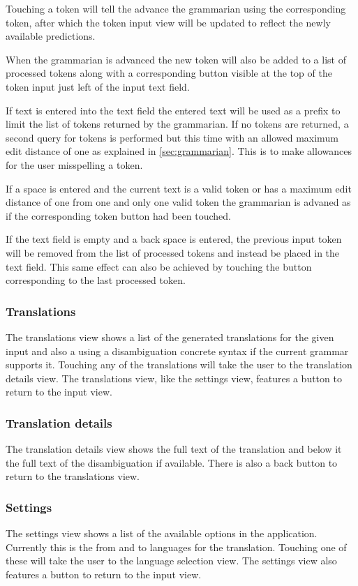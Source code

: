 Touching a token will tell the advance the grammarian using the corresponding token, after which the token input view will be updated to reflect the newly available predictions.

When the grammarian is advanced the new token will also be added to a list of processed tokens along with a corresponding button visible at the top of the token input just left of the input text field.

If text is entered into the text field the entered text will be used as a prefix to limit the list of tokens returned by the grammarian. If no tokens are returned, a second query for tokens is performed but this time with an allowed maximum edit distance of one as explained in \ref{sec:grammarian}. This is to make allowances for the user misspelling a token.

If a space is entered and the current text is a valid token or has a maximum edit distance of one from one and only one valid token the grammarian is advaned as if the corresponding token button had been touched.

If the text field is empty and a back space is entered, the previous input token will be removed from the list of processed tokens and instead be placed in the text field. This same effect can also be achieved by touching the button corresponding to the last processed token.


\subsubsection{Translations}
The translations view shows a list of the generated translations for the given input and also a using a disambiguation concrete syntax if the current grammar supports it. Touching any of the translations will take the user to the translation details view. The translations view, like the settings view, features a button to return to the input view.


\subsubsection{Translation details}
The translation details view shows the full text of the translation and below it the full text of the disambiguation if available. There is also a back button to return to the translations view.


\subsubsection{Settings}
The settings view shows a list of the available options in the application. Currently this is the from and to languages for the translation. Touching one of these will take the user to the language selection view. The settings view also features a button to return to the input view.


